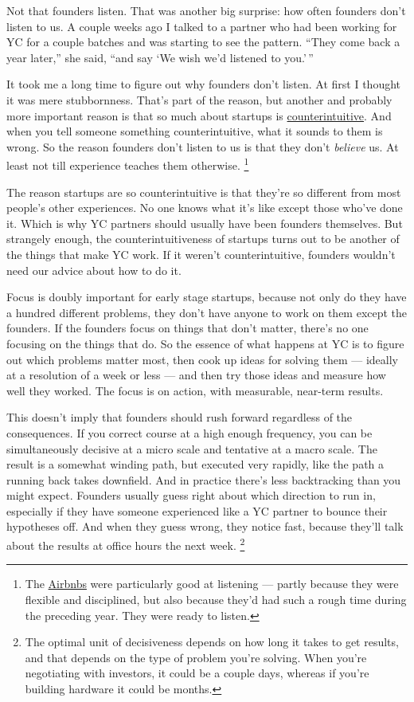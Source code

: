Not that founders listen. That was another big surprise: how often
founders don't listen to us. A couple weeks ago I talked to a partner
who had been working for YC for a couple batches and was starting to see
the pattern. ``They come back a year later,'' she said, ``and say `We
wish we'd listened to you.'\,''

It took me a long time to figure out why founders don't listen. At first
I thought it was mere stubbornness. That's part of the reason, but
another and probably more important reason is that so much about
startups is \href{before.html}{counterintuitive}. And when you tell
someone something counterintuitive, what it sounds to them is wrong. So
the reason founders don't listen to us is that they don't \emph{believe}
us. At least not till experience teaches them otherwise.
\footnote{The \href{airbnbs.html}{Airbnbs} were particularly good at
listening --- partly because they were flexible and disciplined, but
also because they'd had such a rough time during the preceding year.
They were ready to listen.}

The reason startups are so counterintuitive is that they're so different
from most people's other experiences. No one knows what it's like except
those who've done it. Which is why YC partners should usually have been
founders themselves. But strangely enough, the counterintuitiveness of
startups turns out to be another of the things that make YC work. If it
weren't counterintuitive, founders wouldn't need our advice about how to
do it.

Focus is doubly important for early stage startups, because not only do
they have a hundred different problems, they don't have anyone to work
on them except the founders. If the founders focus on things that don't
matter, there's no one focusing on the things that do. So the essence of
what happens at YC is to figure out which problems matter most, then
cook up ideas for solving them --- ideally at a resolution of a week or
less --- and then try those ideas and measure how well they worked. The
focus is on action, with measurable, near-term results.

This doesn't imply that founders should rush forward regardless of the
consequences. If you correct course at a high enough frequency, you can
be simultaneously decisive at a micro scale and tentative at a macro
scale. The result is a somewhat winding path, but executed very rapidly,
like the path a running back takes downfield. And in practice there's
less backtracking than you might expect. Founders usually guess right
about which direction to run in, especially if they have someone
experienced like a YC partner to bounce their hypotheses off. And when
they guess wrong, they notice fast, because they'll talk about the
results at office hours the next week. \footnote{The optimal unit of decisiveness depends on how long it takes to
get results, and that depends on the type of problem you're solving.
When you're negotiating with investors, it could be a couple days,
whereas if you're building hardware it could be months.}

